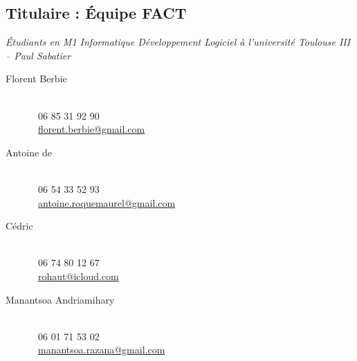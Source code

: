 	\subsection{Titulaire : Équipe FACT}
	\textit{Étudiants en M1 Informatique Développement Logiciel à l'université Toulouse III -- Paul Sabatier}
	\begin{description}
		\item[Florent Berbie]~ \\
	\Telefon~06 85 31 92 90 \\
	\Letter~\href{mailto:florent.berbie@gmail.com}{florent.berbie@gmail.com} \\
	
\item[Antoine de ] ~\\
	\Telefon~06 54 33 52 93\\
	\Letter~\href{mailto:antoine.roquemaurel@gmail.com}{antoine.roquemaurel@gmail.com} \\
	
\item[Cédric ]~\\ 
	\Telefon~06 74 80 12 67\\
	\Letter~\href{mailto:rohaut@icloud.com}{rohaut@icloud.com} \\
	
\item[Manantsoa Andriamihary ] ~\\
	\Telefon~06 01 71 53 02\\
	\Letter~\href{mailto:manantsoa.razana@gmail.com}{manantsoa.razana@gmail.com}
\end{description}



